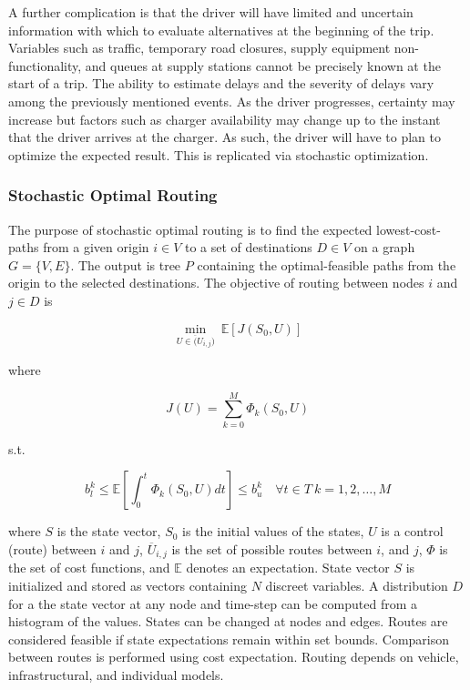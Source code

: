 \documentclass[11pt]{article}
\begin{document}
\begin{multicols}{2}
A further complication is that the driver will have limited and uncertain information with which to evaluate alternatives at the beginning of the trip. Variables such as traffic, temporary road closures, supply equipment non-functionality, and queues at supply stations cannot be precisely known at the start of a trip. The ability to estimate delays and the severity of delays vary among the previously mentioned events. As the driver progresses, certainty may increase but factors such as charger availability may change up to the instant that the driver arrives at the charger. As such, the driver will have to plan to optimize the expected result. This is replicated via stochastic optimization.

\subsubsection*{Stochastic Optimal Routing}

The purpose of stochastic optimal routing is to find the expected lowest-cost-paths from a given origin $i \in V$ to a set of destinations $D \in V$ on a graph $G = \{V, E\}$. The output is tree $P$ containing the optimal-feasible paths from the origin to the selected destinations. The objective of routing between nodes $i$ and $j\in D$ is

\begin{equation}
	\min_{U \in \overline({U}_{i,j})}\ \mathbb{E}[J(S_0, U)]
\end{equation}

where

\begin{equation}
	J(U) = \sum_{k = 0}^M \Phi_k(S_0, U)
\end{equation}

s.t.

\begin{equation}	
	b^k_l \leq \mathbb{E}\left[\int_0^t \Phi_k(S_0, U)dt\right] \leq b^k_u\quad \forall t \in T\ k = 1, 2, \dots, M
\end{equation}

\noindent where $S$ is the state vector, $S_0$ is the initial values of the states, $U$ is a control (route) between $i$ and $j$, $\overline{U}_{i,j}$ is the set of possible routes between $i$, and $j$, $\Phi$ is the set of cost functions, and $\mathbb{E}$ denotes an expectation. State vector $S$ is initialized and stored as vectors containing $N$ discreet variables. A distribution $D$ for a the state vector at any node and time-step can be computed from a histogram of the values. States can be changed at nodes and edges. Routes are considered feasible if state expectations remain within set bounds. Comparison between routes is performed using cost expectation. Routing depends on vehicle, infrastructural, and individual models.



\end{multicols}
\end{document}
